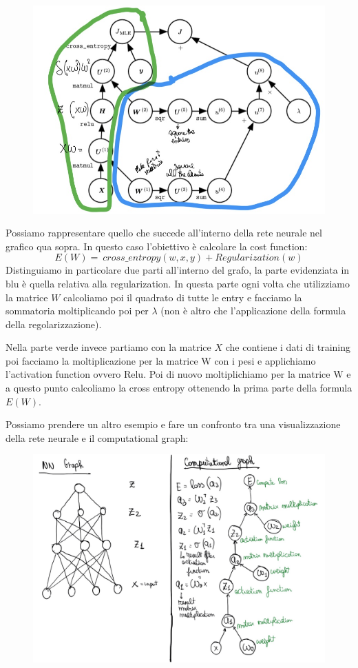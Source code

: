 \documentclass[14pt]{extreport}
\begin{document}
\begin{figure}[H]
\centering
\includegraphics[width=0.7\linewidth]{396.jpeg}
\end{figure}

Possiamo rappresentare quello che succede all'interno della rete neurale nel grafico qua sopra. In questo caso l'obiettivo è calcolare la cost
function: $$E(W) = \ cross\_entropy(w,x,y) + Regularization(w)$$ Distinguiamo in particolare due parti all'interno del grafo, la parte evidenziata in
blu è quella relativa alla regularization. In questa parte ogni volta che utilizziamo la matrice $W$ calcoliamo poi il quadrato di tutte le entry e
facciamo la sommatoria moltiplicando poi per $\lambda$ (non è altro che l'applicazione della formula della regolarizzazione). 

Nella parte verde invece partiamo con la matrice $X$ che contiene i dati di training poi facciamo la moltiplicazione per la matrice W con i pesi e
applichiamo l'activation function ovvero Relu. Poi di nuovo moltiplichiamo per la matrice W e a questo punto calcoliamo la cross entropy ottenendo la
prima parte della formula $E(W)$.


Possiamo prendere un altro esempio e fare un confronto tra una visualizzazione della rete neurale e il computational graph:

\begin{figure}[H]
\centering
\includegraphics[width=\linewidth]{397.jpeg}
\end{figure}
\end{document}
